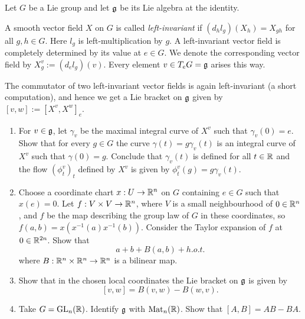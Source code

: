 \documentclass[11pt, english]{article}
\begin{document}
\begin{exc}
Let $G$ be a Lie group and let $\mathfrak g$ be its Lie algebra at the identity.

A smooth vector field $X$ on $G$ is called \emph{left-invariant} if $(d_hl_g)(X_h)=X_{gh}$ for all $g,h \in G$. Here $l_g$ is left-multiplication by $g$. A left-invariant vector field is completely determined by its value at $e \in G$. We denote the corresponding vector field by $X^v_g := (d_el_g)(v)$. Every element $v \in T_e G=\mathfrak g$ arises this way. 

The commutator of two left-invariant vector fields is again left-invariant (a short computation), and hence we get a Lie bracket on $\mathfrak g$ given by $[v,w] := [X^v, X^w]_e$. 

\begin{enumerate}
\item For $v \in \mathfrak g$, let $\gamma_v$ be the maximal integral curve of $X^v$ such that $\gamma_v(0)=e$. Show that for every $g \in G$ the curve $\gamma(t)=g \gamma_v(t)$ is an integral curve of $X^v$ such that $\gamma(0)=g$. Conclude that $\gamma_v(t)$ is defined for all $t \in \mathbb{R}$ and the flow $(\phi_t^v)_t$ defined by $X^v$ is given by $\phi_t^v(g)=g\gamma_v(t)$. 

\item Choose a coordinate chart $x:U \to \mathbb{R}^n$ on $G$ containing $e \in G$ such that $x(e)=0$. Let $f:V \times V \to \mathbb{R}^n$, where $V$ is a small neighbourhood of $0 \in \mathbb{R}^n$, and $f$ be the map describing the group law of $G$ in these coordinates, so $f(a,b)=x(x^{-1}(a)x^{-1}(b))$. Consider the Taylor expansion of $f$ at $0 \in \mathbb{R}^{2n}$. Show that
$$
a+b+B(a,b)+h.o.t.
$$
where $B:\mathbb{R}^n \times \mathbb{R}^n \to \mathbb{R}^n$ is a bilinear map.

\item Show that in the chosen local coordinates the Lie bracket on $\mathfrak g$ is given by
\[
[v,w] = B(v,w) - B(w,v).
\]
\item Take $G=\operatorname{GL}_n(\mathbb{R})$. Identify $\mathfrak g$ with $\mathrm{Mat}_n(\mathbb{R})$. Show that $[A,B] = AB-BA$.
\end{enumerate}
\end{exc}
\end{document}
